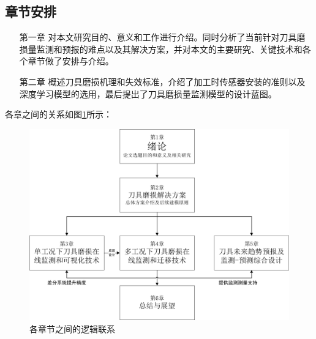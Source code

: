 \subsection{章节安排}

\begin{enumerate}
	\item[第一章] 对本文研究目的、意义和工作进行介绍。同时分析了当前针对刀具磨损量监测和预报的难点以及其解决方案，并对本文的主要研究、关键技术和各个章节做了安排与介绍。
	\item[第二章] 概述刀具磨损机理和失效标准，介绍了加工时传感器安装的准则以及深度学习模型的选用，最后提出了刀具磨损量监测模型的设计蓝图。
\end{enumerate}

各章之间的关系如图\ref{fig:chapter_relation}所示：

\begin{figure}[!htbp]
	\centering
	\includegraphics[width=0.7\linewidth]{figures/chapter_relation}
	\caption{各章节之间的逻辑联系}
	\label{fig:chapter_relation}
\end{figure}

\endinput



